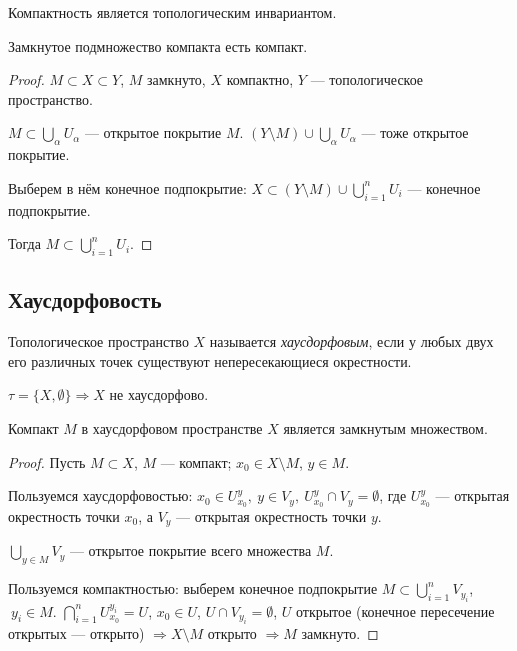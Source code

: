 \begin{remark}
    Компактность является топологическим инвариантом.
\end{remark}

\begin{statement}
    Замкнутое подмножество компакта есть компакт.
\end{statement}
\begin{proof}
    $M \subset X \subset Y$, $M$ замкнуто, $X$ компактно, $Y$ — топологическое пространство.

    $M \subset \bigcup\limits_{\alpha} U_{\alpha}$ — открытое покрытие $M$.
    $(Y \setminus M) \cup \bigcup\limits_{\alpha} U_{\alpha}$ — тоже открытое покрытие.

    Выберем в нём конечное подпокрытие:
    $X \subset (Y \setminus M) \cup \bigcup\limits_{i = 1}^n U_i$ — конечное подпокрытие.

    Тогда $M \subset \bigcup\limits_{i = 1}^n U_i$.
\end{proof}


\subsection{Хаусдорфовость}
\begin{definition}
    Топологическое пространство $X$ называется \textit{хаусдорфовым}, если у любых двух его различных точек существуют непересекающиеся окрестности.
\end{definition}

$\tau = \{X, \emptyset\} \Longrightarrow X$ не хаусдорфово.

\begin{lemma}
    Компакт $M$ в хаусдорфовом пространстве $X$ является замкнутым множеством.
\end{lemma}
\begin{proof}
    Пусть $M \subset X$, $M$ — компакт;
    $x_0 \in X \setminus M$, $y \in M$.

    Пользуемся хаусдорфовостью: $x_0 \in U_{x_0}^y, \ y \in V_y, \ U_{x_0}^y \cap V_y = \emptyset$, где $U_{x_0}^y$ — открытая окрестность точки $x_0$, а $V_y$ — открытая окрестность точки $y$.

    $\bigcup_{y \in M} V_y$ — открытое покрытие всего множества $M$.

    Пользуемся компактностью: выберем конечное подпокрытие $M \subset \bigcup_{i = 1}^n V_{y_i}$, $\ y_i \in M$.
    $\bigcap_{i = 1}^n U_{x_0}^{y_i} = U$, $x_0 \in U$, $U \cap V_{y_i} = \emptyset$, $U$ открытое (конечное пересечение открытых — открыто) $\Longrightarrow X \setminus M$ открыто $\Longrightarrow M$ замкнуто.
\end{proof}


